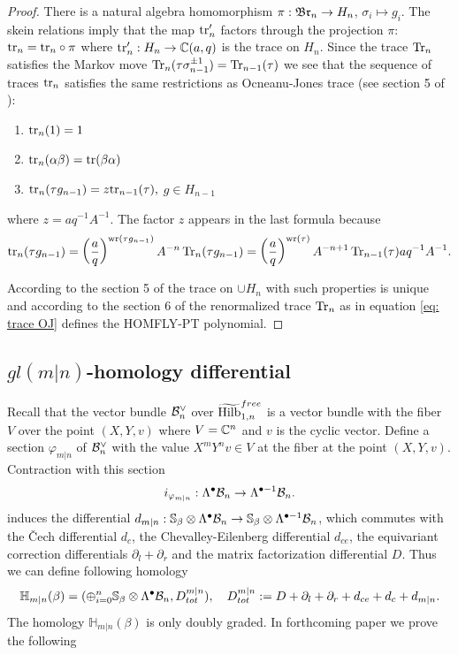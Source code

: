 \documentclass[10pt]{amsart}
\begin{document}
\begin{proof}
There is a natural algebra homomorphism $\pi:\mathfrak{Br}_n\to H_n$, \(\sigma_i\mapsto g_i\).
The skein relations imply that the map $\textup{tr}'_n$ factors through the projection $\pi$:
$\textup{tr}_n=\textup{tr}_n\circ \pi$ where $\textup{tr}'_n: H_n\to \mathbb{C}(a,q)$ is the trace on $H_n$. Since the trace $\mathop{{\rm Tr}}\nolimits_n$ satisfies the Markov move $\mathop{{\rm Tr}}\nolimits_n(\tau\sigma_{n-1}^{\pm1 })=\mathop{{\rm Tr}}\nolimits_{n-1}(\tau)$ we see that
the sequence of traces $\textup{tr}_n$ satisfies the same restrictions as Ocneanu-Jones trace (see section 5 of \cite{Jones}):
\begin{enumerate}
\item $\textup{tr}_n(1)=1$
\item $\textup{tr}_n(\alpha\beta)=\textup{tr}(\beta\alpha)$
\item $\textup{tr}_n(\tau g_{n-1})=z\textup{tr}_{n-1}(\tau),$  $g\in H_{n-1}$
\end{enumerate}
where $z=aq^{-1}A^{-1}$.
The factor \(z\) appears in the last formula because
\[\textup{tr}_n(\tau g_{n-1})=\left(\frac{a}{q}\right)^{\mathrm{wr}(\tau g_{n-1})}A^{-n}\mathop{{\rm Tr}}\nolimits_n( \tau g_{n-1})=
\left(\frac{a}{q}\right)^{\mathrm{wr}(\tau)}A^{-n+1} \mathop{{\rm Tr}}\nolimits_{n-1}(\tau) aq^{-1}A^{-1}.\]

According to the section 5 of \cite{Jones} the trace on $\cup H_n$ with such properties is unique and according to the section 6 of \cite{Jones} the renormalized trace $\mathop{{\rm Tr}}\nolimits_n$ as in equation
\ref{eq: trace OJ} defines the HOMFLY-PT polynomial.
\end{proof}

\subsection{$gl(m|n)$-homology differential}
Recall that the vector bundle $\mathcal{B}_n^\vee$ over $\widetilde{\mathrm{Hilb}}^{free}_{1,n}$ is  a vector bundle with the fiber $V $ over the point $(X,Y,v)$ where $V=\mathbb{C}^n$ and $v$ is
the cyclic vector. Define a section $\varphi_{m|n}$ of $\mathcal{B}_n^\vee$ with the value $X^mY^n v\in V$ at the fiber at the point $(X,Y,v)$. Contraction with this
section
$$i_{\varphi_{m|n}}: \Lambda^\bullet \mathcal{B}_n\to \Lambda^{\bullet-1}\mathcal{B}_n.$$
induces the differential  $d_{m|n}: \mathbb{S}_\beta\otimes \Lambda^\bullet\mathcal{B}_n\to \mathbb{S}_\beta\otimes \Lambda^{\bullet-1}\mathcal{B}_n$, which
commutes with the \v{C}ech differential
$d_c$, the Chevalley-Eilenberg differential $d_{ce}$, the equivariant correction differentials $\partial_l+\partial_r$ and the matrix factorization differential $D$. Thus  we can define following homology
$$ \mathbb{H}_{m|n}(\beta)=(\oplus_{i=0}^n \mathbb{S}_\beta\otimes \Lambda^\bullet\mathcal{B}_n, D_{tot}^{m|n}),\quad D_{tot}^{m|n}:=D+\partial_l+\partial_r+d_{ce}+d_{c}+d_{m|n}.$$
The homology $\mathbb{H}_{m|n}(\beta)$ is only doubly graded. In forthcoming paper we prove the following
\end{document}
